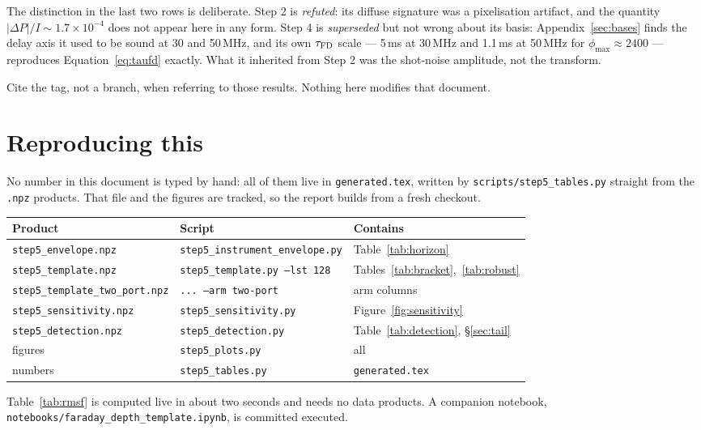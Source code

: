 \documentclass[11pt]{article}
\newcommand{\code}[1]{\texttt{#1}}
\begin{document}
The distinction in the last two rows is deliberate. Step 2 is
\emph{refuted}: its diffuse signature was a pixelisation artifact, and
the quantity $|\Delta P|/I \sim 1.7\times10^{-4}$ does not appear here
in any form. Step 4 is \emph{superseded} but not wrong about its
basis: Appendix~\ref{sec:bases} finds the delay axis it used to be
sound at 30 and 50\,MHz, and its own $\tau_{\rm FD}$ scale --- 5\,ms at
30\,MHz and 1.1\,ms at 50\,MHz for $\phi_{\max}\approx2400$ ---
reproduces Equation~\eqref{eq:taufd} exactly. What it inherited from
Step 2 was the shot-noise amplitude, not the transform.

Cite the tag, not a branch, when referring to those results. Nothing
here modifies that document.

\section{Reproducing this}
\label{sec:repro}

No number in this document is typed by hand: all of them live in
\code{generated.tex}, written by \code{scripts/step5\_tables.py}
straight from the \code{.npz} products. That file and the figures are
tracked, so the report builds from a fresh checkout.

\begin{center}
\begin{tabular}{lll}
\toprule
Product & Script & Contains \\
\midrule
\code{step5\_envelope.npz} & \code{step5\_instrument\_envelope.py}
  & Table~\ref{tab:horizon} \\
\code{step5\_template.npz} & \code{step5\_template.py --lst 128}
  & Tables~\ref{tab:bracket},~\ref{tab:robust} \\
\code{step5\_template\_two\_port.npz} & \code{... --arm two-port}
  & arm columns \\
\code{step5\_sensitivity.npz} & \code{step5\_sensitivity.py}
  & Figure~\ref{fig:sensitivity} \\
\code{step5\_detection.npz} & \code{step5\_detection.py}
  & Table~\ref{tab:detection}, \S\ref{sec:tail} \\
figures & \code{step5\_plots.py} & all \\
numbers & \code{step5\_tables.py} & \code{generated.tex} \\
\bottomrule
\end{tabular}
\end{center}

Table~\ref{tab:rmsf} is computed live in about two seconds and needs no
data products. A companion notebook,
\code{notebooks/faraday\_depth\_template.ipynb}, is committed executed.
\end{document}

